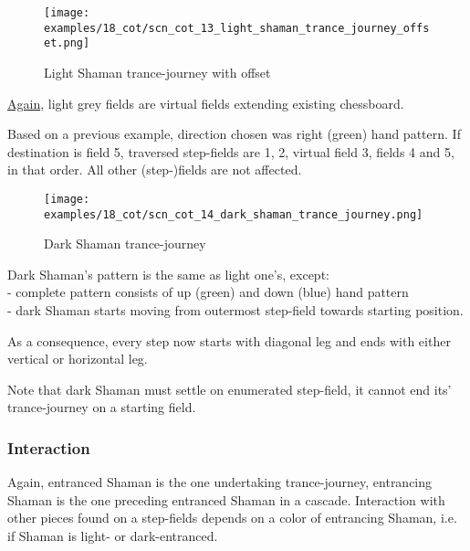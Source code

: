 \noindent
\begin{figure}[!h]
\texttt{[image: examples/18\_cot/scn\_cot\_13\_light\_shaman\_trance\_journey\_offset.png]}
\caption{Light Shaman trance-journey with offset}
\label{fig:scn_cot_13_light_shaman_trance_journey_offset}
\end{figure}

\hyperref[fig:scn_hd_04_centaur_off_board]{Again},
light grey fields are virtual fields extending existing chessboard.

Based on a previous example, direction chosen was right (green) hand pattern.
If destination is field 5, traversed step-fields are 1, 2, virtual field 3,
fields 4 and 5, in that order. All other (step-)fields are not affected.

\clearpage %

\noindent
\begin{figure}[!h]
\texttt{[image: examples/18\_cot/scn\_cot\_14\_dark\_shaman\_trance\_journey.png]}
\caption{Dark Shaman trance-journey}
\label{fig:scn_cot_14_dark_shaman_trance_journey}
\end{figure}

Dark Shaman's pattern is the same as light one's, except: \\
- complete pattern consists of up (green) and down (blue) hand pattern \\
- dark Shaman starts moving from outermost step-field towards starting position.

As a consequence, every step now starts with diagonal leg and ends with either
vertical or horizontal leg.


Note that dark Shaman must settle on enumerated step-field, it cannot end its'
trance-journey on a starting field.

\subsubsection*{Interaction}

Again, entranced Shaman is the one undertaking trance-journey, entrancing Shaman
is the one preceding entranced Shaman in a cascade. Interaction with other pieces
found on a step-fields depends on a color of entrancing Shaman, i.e. if Shaman is
light- or dark-entranced.

